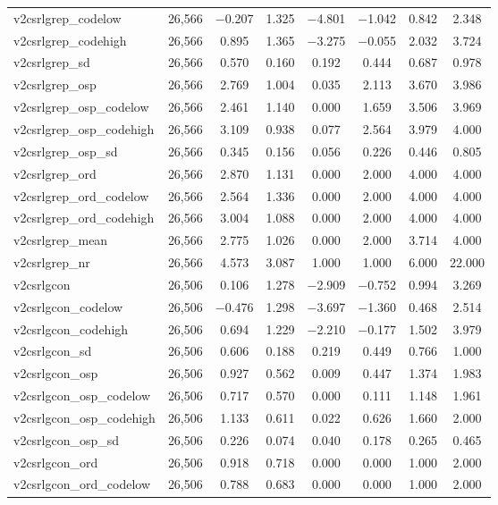 \begin{table}[!htbp]
\begin{tabular}{@{\extracolsep{5pt}}lccccccc}
v2csrlgrep\_codelow & 26,566 & $-$0.207 & 1.325 & $-$4.801 & $-$1.042 & 0.842 & 2.348 \\ 
v2csrlgrep\_codehigh & 26,566 & 0.895 & 1.365 & $-$3.275 & $-$0.055 & 2.032 & 3.724 \\ 
v2csrlgrep\_sd & 26,566 & 0.570 & 0.160 & 0.192 & 0.444 & 0.687 & 0.978 \\ 
v2csrlgrep\_osp & 26,566 & 2.769 & 1.004 & 0.035 & 2.113 & 3.670 & 3.986 \\ 
v2csrlgrep\_osp\_codelow & 26,566 & 2.461 & 1.140 & 0.000 & 1.659 & 3.506 & 3.969 \\ 
v2csrlgrep\_osp\_codehigh & 26,566 & 3.109 & 0.938 & 0.077 & 2.564 & 3.979 & 4.000 \\ 
v2csrlgrep\_osp\_sd & 26,566 & 0.345 & 0.156 & 0.056 & 0.226 & 0.446 & 0.805 \\ 
v2csrlgrep\_ord & 26,566 & 2.870 & 1.131 & 0.000 & 2.000 & 4.000 & 4.000 \\ 
v2csrlgrep\_ord\_codelow & 26,566 & 2.564 & 1.336 & 0.000 & 2.000 & 4.000 & 4.000 \\ 
v2csrlgrep\_ord\_codehigh & 26,566 & 3.004 & 1.088 & 0.000 & 2.000 & 4.000 & 4.000 \\ 
v2csrlgrep\_mean & 26,566 & 2.775 & 1.026 & 0.000 & 2.000 & 3.714 & 4.000 \\ 
v2csrlgrep\_nr & 26,566 & 4.573 & 3.087 & 1.000 & 1.000 & 6.000 & 22.000 \\ 
v2csrlgcon & 26,506 & 0.106 & 1.278 & $-$2.909 & $-$0.752 & 0.994 & 3.269 \\ 
v2csrlgcon\_codelow & 26,506 & $-$0.476 & 1.298 & $-$3.697 & $-$1.360 & 0.468 & 2.514 \\ 
v2csrlgcon\_codehigh & 26,506 & 0.694 & 1.229 & $-$2.210 & $-$0.177 & 1.502 & 3.979 \\ 
v2csrlgcon\_sd & 26,506 & 0.606 & 0.188 & 0.219 & 0.449 & 0.766 & 1.000 \\ 
v2csrlgcon\_osp & 26,506 & 0.927 & 0.562 & 0.009 & 0.447 & 1.374 & 1.983 \\ 
v2csrlgcon\_osp\_codelow & 26,506 & 0.717 & 0.570 & 0.000 & 0.111 & 1.148 & 1.961 \\ 
v2csrlgcon\_osp\_codehigh & 26,506 & 1.133 & 0.611 & 0.022 & 0.626 & 1.660 & 2.000 \\ 
v2csrlgcon\_osp\_sd & 26,506 & 0.226 & 0.074 & 0.040 & 0.178 & 0.265 & 0.465 \\ 
v2csrlgcon\_ord & 26,506 & 0.918 & 0.718 & 0.000 & 0.000 & 1.000 & 2.000 \\ 
v2csrlgcon\_ord\_codelow & 26,506 & 0.788 & 0.683 & 0.000 & 0.000 & 1.000 & 2.000 \\ 

\end{tabular}
\end{table}
